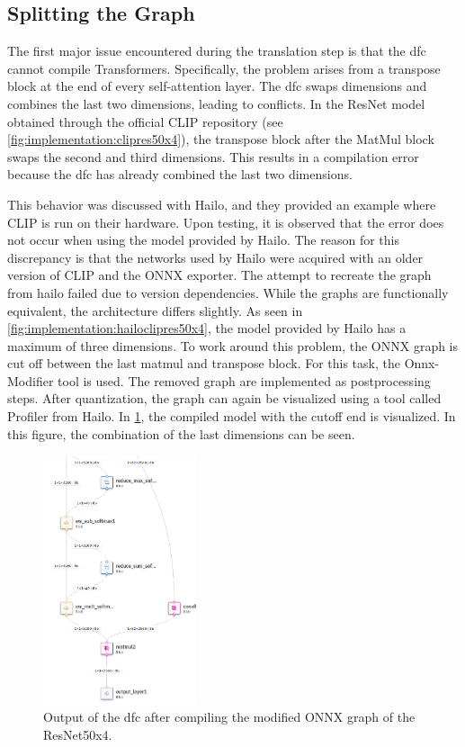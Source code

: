 \subsection{Splitting the Graph
\label{subsection:implementation:splitgraph}}

The first major issue encountered during the translation step is that the \acrshort{dfc} cannot compile Transformers.
Specifically, the problem arises from a transpose block at the end of every self-attention layer.
The \acrshort{dfc} swaps dimensions and combines the last two dimensions, leading to conflicts.
In the ResNet model obtained through the official CLIP repository (see \cref{fig:implementation:clipres50x4}), the transpose block after the MatMul block swaps the second and third dimensions.
This results in a compilation error because the \acrshort{dfc} has already combined the last two dimensions.

This behavior was discussed with Hailo, and they provided an example where CLIP is run on their hardware. Upon testing, it is observed that the error does not occur when using the model provided by Hailo.
The reason for this discrepancy is that the networks used by Hailo were acquired with an older version of CLIP and the ONNX exporter.
The attempt to recreate the graph from hailo failed due to version dependencies.
While the graphs are functionally equivalent, the architecture differs slightly.
As seen in \cref{fig:implementation:hailoclipres50x4}, the model provided by Hailo has a maximum of three dimensions.
To work around this problem, the ONNX graph is cut off between the last matmul and transpose block.
For this task, the Onnx-Modifier tool \cite{onnxmodifier} is used.
The removed graph are implemented as postprocessing steps.
After quantization, the graph can again be visualized using a tool called Profiler from Hailo.
In \cref{fig:implementation:compareRN50x4qunathar}, the compiled model with the cutoff end is visualized.
In this figure, the combination of the last dimensions can be seen.

\begin{figure}
    \centering
    \includegraphics[width=0.4\textwidth]{Images/Implementation/ClipRes50x4_qunat_Har.png}
    \caption{Output of the \acrshort{dfc} after compiling the modified ONNX graph of the ResNet50x4.}
    \label{fig:implementation:compareRN50x4qunathar}
\end{figure}

